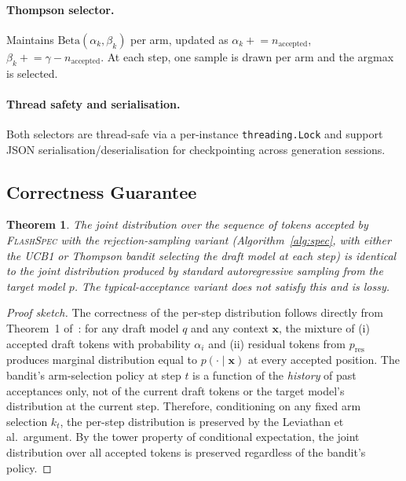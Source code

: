 \documentclass[11pt]{article}
\newtheorem{theorem}{Theorem}
\newcommand{\flashspec}{\textsc{FlashSpec}}
\begin{document}
\paragraph{Thompson selector.}
Maintains $\mathrm{Beta}(\alpha_k, \beta_k)$ per arm, updated as
$\alpha_k \mathrel{+}= n_{\text{accepted}}$,
$\beta_k \mathrel{+}= \gamma - n_{\text{accepted}}$.
At each step, one sample is drawn per arm and the argmax is selected.

\paragraph{Thread safety and serialisation.}
Both selectors are thread-safe via a per-instance \texttt{threading.Lock}
and support JSON serialisation/deserialisation for checkpointing across
generation sessions.

\subsection{Correctness Guarantee}
\label{sec:correctness}

\begin{theorem}
\label{thm:correctness}
The joint distribution over the sequence of tokens accepted by
\flashspec{} with the rejection-sampling variant
(Algorithm~\ref{alg:spec}, with either the UCB1 or Thompson bandit
selecting the draft model at each step) is identical to the joint
distribution produced by standard autoregressive sampling from the target
model $p$.
The typical-acceptance variant does not satisfy this and is lossy.
\end{theorem}

\begin{proof}[Proof sketch]
The correctness of the per-step distribution follows directly from
Theorem~1 of~\citet{leviathan2023fast}: for any draft model $q$ and any
context $\mathbf{x}$, the mixture of (i) accepted draft tokens with
probability $\alpha_i$ and (ii) residual tokens from $p_{\text{res}}$
produces marginal distribution equal to $p(\cdot \mid \mathbf{x})$ at every
accepted position.
The bandit's arm-selection policy at step $t$ is a function of the
\emph{history} of past acceptances only, not of the current draft tokens or
the target model's distribution at the current step.
Therefore, conditioning on any fixed arm selection $k_t$, the per-step
distribution is preserved by the Leviathan et al.\ argument.
By the tower property of conditional expectation, the joint distribution over
all accepted tokens is preserved regardless of the bandit's policy.
\end{proof}
\end{document}
